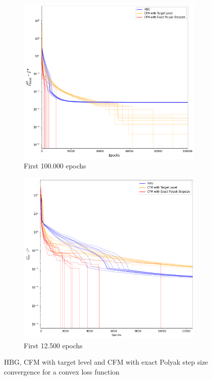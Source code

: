 \begin{figure}[htbp]
    \centering
    \begin{subfigure}{.5\textwidth}
        \centering
        \includegraphics[width=.9\textwidth]{images/convex_100000.png}
        \caption{First 100.000 epochs}
        \label{fig:convex_100000}
    \end{subfigure}%
    \begin{subfigure}{.5\textwidth}
        \centering
        \includegraphics[width=.9\textwidth]{images/convex_12500.png}
        \caption{First 12.500 epochs}
        \label{fig:convex_12500}
    \end{subfigure}
    \caption{HBG, CFM with target level and CFM with exact Polyak step size convergence for a convex loss function}
    \label{fig:convex}
\end{figure}

